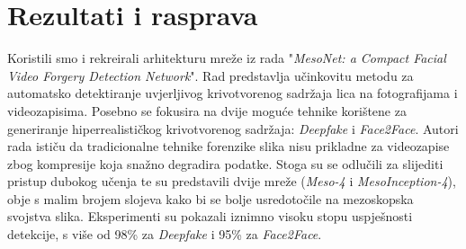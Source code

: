 \documentclass[seminarski, times, utf8]{fer}
\begin{document}
\chapter{Rezultati i rasprava}
\label{pog:rezultati_i_rasprava}
Koristili smo i rekreirali arhitekturu mreže iz rada "\textit{MesoNet: a Compact Facial Video Forgery Detection Network}\cite{mesonet}". Rad predstavlja učinkovitu metodu za automatsko detektiranje uvjerljivog krivotvorenog sadržaja lica na fotografijama i videozapisima. Posebno se fokusira na dvije moguće tehnike korištene za generiranje hiperrealističkog krivotvorenog sadržaja: \textit{Deepfake} i \textit{Face2Face}. Autori rada ističu da tradicionalne tehnike forenzike slika nisu prikladne za videozapise zbog kompresije koja snažno degradira podatke. Stoga su se odlučili za slijediti pristup dubokog učenja te su predstavili dvije mreže (\textit{Meso-4} i \textit{MesoInception-4}), obje s malim brojem slojeva kako bi se bolje usredotočile na mezoskopska svojstva slika. Eksperimenti su pokazali iznimno visoku stopu uspješnosti detekcije, s više od 98\% za \textit{Deepfake} i 95\% za \textit{Face2Face}.
\end{document}
